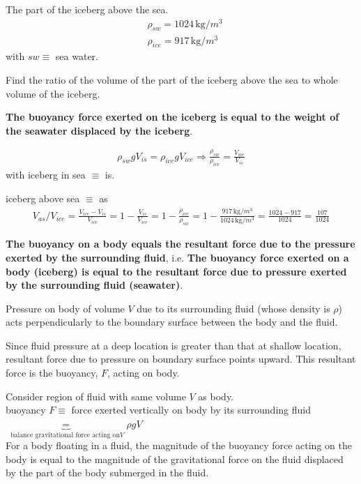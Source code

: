  The part of the iceberg above the sea.
\[
\begin{aligned}
& \rho_{sw} = 1024 \, \text{kg}/m^3 \\
& \rho_{ice} = 917 \, \text{kg}/m^3
\end{aligned}
\]
with $sw \equiv$ sea water.

Find the ratio of the volume of the part of the iceberg above the sea to whole volume of the iceberg.


\textbf{The buoyancy force exerted on the iceberg is equal to the weight of the seawater displaced by the iceberg}.

\[
\begin{gathered}
	\rho_{sw} g V_{is} = \rho_{ice} gV_{ice} \Longrightarrow \frac{ \rho_{sw} }{ \rho_{ice}} = \frac{V_{ice}}{ V_{is}} 
\end{gathered}
\]
with iceberg in sea $\equiv$ is.

iceberg above sea $\equiv$ as
\[
\begin{gathered}
V_{as} / V_{ice} = \frac{V_{ice} - V_{is}}{ V_{ice}} = 1 - \frac{V_{is}}{V_{ice}} = 1 - \frac{ \rho_{ice}}{ \rho_{sw}} = 1 - \frac{917 \, \text{kg}/m^3}{ 1024 \, \text{kg}/ m^3 } = \frac{ 1024 - 917 }{ 1024} = \frac{107 } {1024} 
\end{gathered}
\]

\textbf{The buoyancy on a body equals the resultant force due to the pressure exerted by the surrounding fluid}, i.e.
\textbf{The buoyancy force exerted on a body (iceberg) is equal to the resultant force due to pressure exerted by the surrounding fluid (seawater)}.


Pressure on body of volume $V$ due to its surrounding fluid (whose density is $\rho$) acts perpendicularly to the boundary surface between the body and the fluid. 

Since fluid pressure at a deep location is greater than that at shallow location, resultant force due to pressure on boundary surface points upward. This resultant force is the buoyancy, $F$, acting on body. 

Consider region of fluid with same volume $V$ as body. \\

buoyancy $F \equiv$ force exerted vertically on body by its surrounding fluid $ \underbrace{ =}_{ \text{ balance gravitational force acting on} V }  \rho g V$ \\

For a body floating in a fluid, the magnitude of the buoyancy force acting on the body is equal to the magnitude of the gravitational force on the fluid displaced by the part of the body submerged in the fluid.



